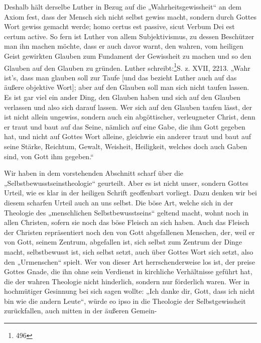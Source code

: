 Deshalb hält derselbe Luther in Bezug auf die „Wahrheitsgewissheit“ an dem Axiom fest, dass der Mensch sich nicht selbst gewiss macht, sondern durch Gottes Wort gewiss gemacht werde; homo certus est passive, sicut Verbum Dei est certum active. So fern ist Luther von allem Subjektivismus, zu dessen Beschützer man ihn machen möchte, dass er auch davor warnt, den wahren, vom heiligen Geist gewirkten Glauben zum Fundament der Gewissheit zu machen und so den Glauben auf den Glauben zu gründen. Luther schreibt:\footnote{496}{S. z. XVII, 2213.} „Wahr ist's, dass man glauben soll zur Taufe [und das bezieht Luther auch auf das äußere objektive Wort]; aber auf den Glauben soll man sich nicht taufen lassen. Es ist gar viel ein ander Ding, den Glauben haben und sich auf den Glauben verlassen und also sich darauf lassen. Wer sich auf den Glauben taufen lässt, der ist nicht allein ungewiss, sondern auch ein abgöttischer, verleugneter Christ, denn er traut und baut auf das Seine, nämlich auf eine Gabe, die ihm Gott gegeben hat, und nicht auf Gottes Wort alleine, gleichwie ein anderer traut und baut auf seine Stärke, Reichtum, Gewalt, Weisheit, Heiligkeit, welches doch auch Gaben sind, von Gott ihm gegeben.“\par Wir haben in dem vorstehenden Abschnitt scharf über die „Selbstbewusstseinstheologie“ geurteilt. Aber es ist nicht unser, sondern Gottes Urteil, wie es klar in der heiligen Schrift geoffenbart vorliegt. Dazu denken wir bei diesem scharfen Urteil auch an uns selbst. Die böse Art, welche sich in der Theologie des „menschlichen Selbstbewusstseins“ geltend macht, wohnt noch in allen Christen, sofern sie noch das böse Fleisch an sich haben. Auch das Fleisch der Christen repräsentiert noch den von Gott abgefallenen Menschen, der, weil er von Gott, seinem Zentrum, abgefallen ist, sich selbst zum Zentrum der Dinge macht, selbstbewusst ist, sich selbst setzt, auch über Gottes Wort sich setzt, also den „Urmenschen“ spielt. Wer von dieser Art herrschenderweise los ist, der preise Gottes Gnade, die ihn ohne sein Verdienst in kirchliche Verhältnisse geführt hat, die der wahren Theologie nicht hinderlich, sondern nur förderlich waren. Wer in hochmütiger Gesinnung bei sich sagen wollte: „Ich danke dir, Gott, dass ich nicht bin wie die andern Leute“, würde eo ipso in die Theologie der Selbstgewissheit zurückfallen, auch mitten in der äußeren Gemein-\par\setcounter{footnote}{494}\addtocounter{footnote}{1}